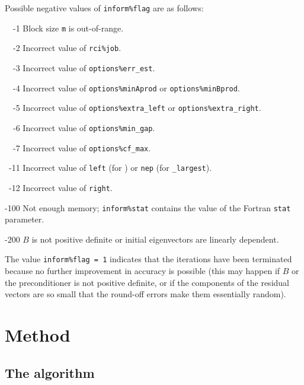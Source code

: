 \label{sec:err.solve}

Possible negative values of {\tt inform\%flag}
are as follows:
%
\begin{description}
%
\item{~~-1}
\hskip 9pt
Block size {\tt m} is out-of-range.
%
\item{~~-2}
\hskip 9pt
Incorrect value of {\tt rci\%job}. 
%
\item{~~-3}
\hskip 9pt
Incorrect value of {\tt options\%err\_est}. 
%
\item{~~-4}
\hskip 9pt
Incorrect value of 
{\tt options\%minAprod} or {\tt options\%minBprod}.
%
\item{~~-5}
\hskip 9pt
Incorrect value of 
{\tt options\%extra\_left} or
{\tt options\%extra\_right}.
%
\item{~~-6}
\hskip 9pt
Incorrect value of {\tt options\%min\_gap}. 
%
\item{~~-7}
\hskip 9pt
Incorrect value of {\tt options\%cf\_max}. 
%
\item{~-11}
\hskip 7pt
Incorrect value of {\tt left} (for {\tt\solver})
or {\tt nep} (for {\tt\solver\_largest}).
%
\item{~-12}
\hskip 7pt
Incorrect value of {\tt right}. 
%
\item{-100}
\hskip 4pt
Not enough memory;
{\tt inform\%stat} contains the value of the Fortran {\tt stat} parameter.
%
\item{-200}
\hskip 4pt
$B$ is not positive definite or initial eigenvectors are linearly dependent.
%
\end{description}

%
The value {\tt inform\%flag = 1}
indicates that
the iterations have been terminated because no further improvement
in accuracy is possible (this may happen if $B$ or the preconditioner is
not positive definite, or if the components of the residual vectors
are so small that the round-off
errors make them essentially random).
%

\section{Method}
\label{sec:method}

\subsection{The algorithm}

